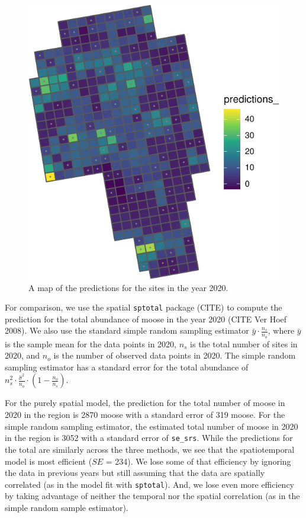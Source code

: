 \documentclass[]{interact}
\theoremstyle{plain}%
\theoremstyle{definition}
\theoremstyle{remark}
\begin{document}
\begin{figure}
\centering
\includegraphics{fpspatiotemp_manu_files/figure-latex/unnamed-chunk-9-1.pdf}
\caption{\label{fig:sitepredmap} A map of the predictions for the sites
in the year 2020.}
\end{figure}

For comparison, we use the spatial \texttt{sptotal} package (CITE) to
compute the prediction for the total abundance of moose in the year 2020
(CITE Ver Hoef 2008). We also use the standard simple random sampling
estimator \(\bar{y} \cdot \frac{n_s}{n_{o}}\), where \(\bar{y}\) is the
sample mean for the data points in 2020, \(n_s\) is the total number of
sites in 2020, and \(n_o\) is the number of observed data points in
2020. The simple random sampling estimator has a standard error for the
total abundance of
\(n_s^2 \cdot \frac{\hat{\sigma}^2}{n_o} \cdot (1 - \frac{n_o}{n_s})\).

For the purely spatial model, the prediction for the total number of
moose in 2020 in the region is 2870 moose with a standard error of 319
moose. For the simple random sampling estimator, the estimated total
number of moose in 2020 in the region is 3052 with a standard error of
\texttt{se\_srs}. While the predictions for the total are similarly
across the three methods, we see that the spatiotemporal model is most
efficient (\(SE\) = 234). We lose some of that efficiency by ignoring
the data in previous years but still assuming that the data are
spatially correlated (as in the model fit with \texttt{sptotal}). And,
we lose even more efficiency by taking advantage of neither the temporal
nor the spatial correlation (as in the simple random sample estimator).
\end{document}
